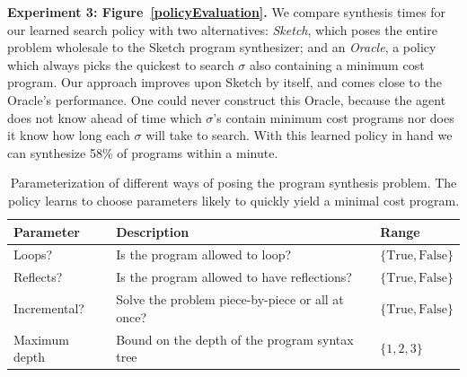 \documentclass{article}
\theoremstyle{definition}
\begin{document}
\textbf{Experiment 3: Figure~\ref{policyEvaluation}.}
We compare synthesis times for our learned search policy
with two alternatives:
 \emph{Sketch}, which poses the
entire problem wholesale to the Sketch program synthesizer;
and an \emph{Oracle},
a policy which always picks the quickest to search $\sigma $
 also containing a minimum cost program.
Our approach improves upon Sketch by itself,
and comes close to the Oracle's performance.
One could never construct this Oracle,
because the agent does not know ahead of time which
$\sigma $'s contain minimum cost programs nor does it know how long each
$\sigma $ will take to search.
With this learned policy in hand we can synthesize 58\% of programs within a minute.
%
\begin{table}[h]\centering
  \caption{Parameterization of different ways of posing the program synthesis problem. The policy learns to choose parameters likely to quickly yield a minimal cost program.
  }\label{policyOutput}
  \begin{tabular}{lll}\toprule
  Parameter&Description&Range\\\midrule
  Loops?&Is the program allowed to loop?&$\{\text{True},\text{False}\}$\\
  Reflects?&Is the program allowed to have reflections?&$\{\text{True},\text{False}\}$\\
  Incremental?&Solve the problem piece-by-piece or all at once?&$\{\text{True},\text{False}\}$\\
  Maximum depth& Bound on the depth of the program syntax tree&$\{1,2,3\}$
  \\\bottomrule
  \end{tabular}
  \end{table}
\end{document}
